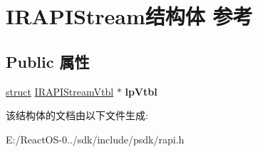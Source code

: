 \hypertarget{struct_i_r_a_p_i_stream}{}\section{I\+R\+A\+P\+I\+Stream结构体 参考}
\label{struct_i_r_a_p_i_stream}
\subsection*{Public 属性}
\begin{DoxyCompactItemize}
\item 
\mbox{\label{struct_i_r_a_p_i_stream_a4597ca5d65f9f57546de3de1c777a45d}} 
\hyperlink{interfacestruct}{struct} \hyperlink{struct_i_r_a_p_i_stream_vtbl}{I\+R\+A\+P\+I\+Stream\+Vtbl} $\ast$ {\bfseries lp\+Vtbl}
\end{DoxyCompactItemize}


该结构体的文档由以下文件生成\+:\begin{DoxyCompactItemize}
\item 
E\+:/\+React\+O\+S-\/0../sdk/include/psdk/rapi.\+h\end{DoxyCompactItemize}
